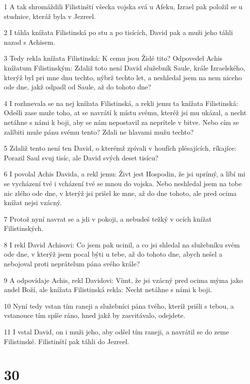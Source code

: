 \par 1 A tak shromáždili Filistinští všecka vojska svá u Afeku, Izrael pak položil se u studnice, kteráž byla v Jezreel.
\par 2 I táhla knížata Filistinská po stu a po tisících, David pak a muži jeho táhli nazad s Achisem.
\par 3 Tedy rekla knížata Filistinská: K cemu jsou Židé tito? Odpovedel Achis knížatum Filistinským: Zdaliž toto není David služebník Saule, krále Izraelského, kterýž byl pri mne dnu techto, nýbrž techto let, a neshledal jsem na nem niceho ode dne, jakž odpadl od Saule, až do tohoto dne?
\par 4 I rozhnevala se na nej knížata Filistinská, a rekli jemu ta knížata Filistinská: Odešli zase muže toho, at se navrátí k místu svému, kteréž jsi mu ukázal, a necht netáhne s námi k boji, aby se nám nepostavil za neprítele v bitve. Nebo cím se zalíbiti muže pánu svému tento? Zdali ne hlavami mužu techto?
\par 5 Zdaliž tento není ten David, o kterémž zpívali v houfích plésajících, ríkajíce: Porazil Saul svuj tisíc, ale David svých deset tisícu?
\par 6 I povolal Achis Davida, a rekl jemu: Živt jest Hospodin, že jsi uprímý, a líbí mi se vycházení tvé i vcházení tvé se mnou do vojska. Nebo neshledal jsem na tobe nic zlého ode dne, v kterýž jsi prišel ke mne, až do dne tohoto, ale pred ocima knížat nejsi vzácný.
\par 7 Protož nyní navrat se a jdi v pokoji, a nebudeš težký v ocích knížat Filistinských.
\par 8 I rekl David Achisovi: Co jsem pak ucinil, a co jsi shledal na služebníku svém ode dne, v kterýž jsem pocal býti u tebe, až do tohoto dne, abych nešel a nebojoval proti neprátelum pána svého krále?
\par 9 A odpovídaje Achis, rekl Davidovi: Vímt, že jsi vzácný pred ocima mýma jako andel Boží, ale knížata Filistinská rekla: Necht netáhne s námi k boji.
\par 10 Nyní tedy vstan tím raneji a služebníci pána tvého, kteríž prišli s tebou, a vstanouce tím spíše ráno, hned jakž by zasvitávalo, odejdete.
\par 11 I vstal David, on i muži jeho, aby odšel tím raneji, a navrátil se do zeme Filistinské. Filistinští pak táhli do Jezreel.

\chapter{30}

